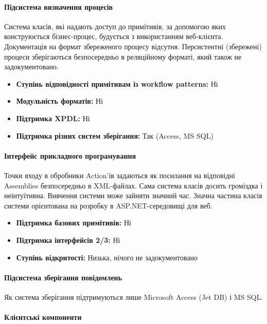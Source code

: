 \documentclass{memoir}
\begin{document}
\paragraph{Підсистема визначення процесів}

Система класів, які надають доступ до примітивів, за допомогою яких конструюється бізнес-процес, будується з використанням веб-клієнта. Документація на формат збереженого процесу відсутня. Персистентні (збережені) процеси зберігаються безпосередньо в реляційному форматі, який також не задокументовано.

\begin{itemize}
    \item \textbf{Ступінь відповідності примітивам із workflow patterns:} Ні
    \item \textbf{Модульність форматів:} Ні
    \item \textbf{Підтримка XPDL:} Ні
    \item \textbf{Підтримка різних систем зберігання:} Так (Access, MS SQL)
\end{itemize}

\paragraph{Інтерфейс прикладного програмування}

Точки входу в обробники Action’ів задаються як посилання на відповідні Assemblies безпосередньо в XML-файлах. Сама система класів досить громіздка і неінтуїтивна. Вивчення системи може зайняти значний час. Значна частина класів системи орієнтована на розробку в ASP.NET-середовищі для веб.

\begin{itemize}
    \item \textbf{Підтримка базових примітивів:} Ні
    \item \textbf{Підтримка інтерфейсів 2/3:} Ні
    \item \textbf{Ступінь відкритості:} Низька, нічого не задокументовано
\end{itemize}

\paragraph{Підсистема зберігання повідомлень}

Як система зберігання підтримуються лише Microsoft Access (Jet DB) і MS SQL.

\paragraph{Клієнтські компоненти}
\end{document}

